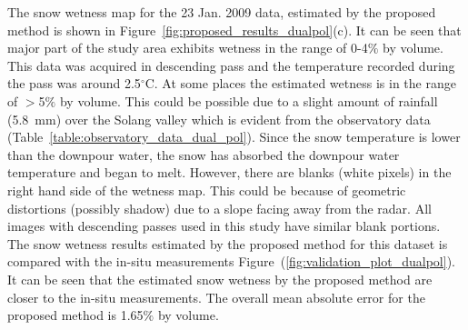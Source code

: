 The snow wetness map for the 23 Jan. 2009 data, estimated by the proposed method is shown in Figure~\ref{fig:proposed_results_dualpol}(c). It can be seen that major part of the study area exhibits wetness in the range of 0-4$\%$ by volume. This data was acquired in descending pass and the temperature recorded during the pass was around 2.5$^\circ$C. At some places the estimated wetness is in the range of $>$5$\%$ by volume. This could be possible due to a slight amount of rainfall (5.8~mm) over the Solang valley which is evident from the observatory data (Table~\ref{table:observatory_data_dual_pol}). Since the snow temperature is lower than the downpour water, the snow has absorbed the downpour water temperature and began to melt. However, there are blanks (white pixels) in the right hand side of the wetness map. This could be because of geometric distortions (possibly shadow) due to a slope facing away from the radar. All images with descending passes used in this study have similar blank portions. The snow wetness results estimated by the proposed method for this dataset is compared with the in-situ measurements Figure~(\ref{fig:validation_plot_dualpol}). It can be seen that the estimated snow wetness by the proposed method are closer to the in-situ measurements. The overall mean absolute error for the proposed method is 1.65$\%$ by volume.

